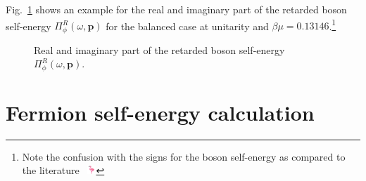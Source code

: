 Fig.~\ref{fig:boson-self-energy} shows an example for the real and imaginary part of the retarded boson self-energy $\Pi^{R}_{\phi}(\omega,\bm{p})$ for the balanced case at unitarity and $\beta\mu=0.13146$.\footnote{Note the confusion with the signs for the boson self-energy as compared to the literature \ \includegraphics[width=0.025\textwidth]{figs/flamingo.png}}

\vspace{1cm}

\begin{figure}[h]
	\centering
	\caption[Boson self-energy]{Real and imaginary part of the retarded boson self-energy $\Pi^{R}_{\phi}(\omega,\bm{p})$.}
	\label{fig:boson-self-energy}
\end{figure}


\clearpage

\section{Fermion self-energy calculation}
\label{app:fermion-self-energy-calculation}


